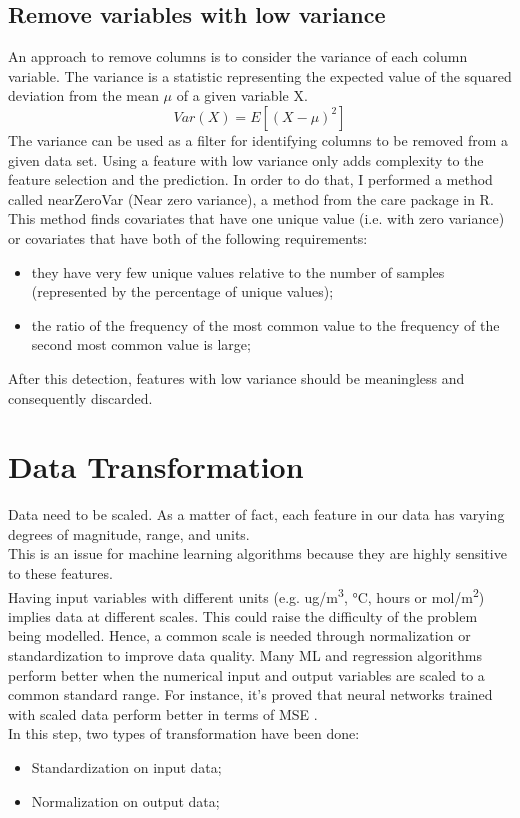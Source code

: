 \subsection{Remove variables with low variance}
An approach to remove columns is to consider the variance of each column variable. The variance is a statistic representing the expected value of the squared deviation from the mean $\mu$ of a given variable X. 
\begin{equation}
  Var(X) = E[(X-\mu)^2]
\end{equation}
The variance can be used as a filter for identifying columns to be removed from a given data set. 
Using a feature with low variance only adds complexity to the feature selection and the prediction.\newline
In order to do that, I performed a method called nearZeroVar (Near zero variance), a method from the \gls{care} package in R.\\
This method finds covariates that have one unique value (i.e. with zero variance) or covariates that have both of the following requirements:
\begin{itemize}
\item they have very few unique values relative to the number of samples (represented by the percentage of unique values);
\item the ratio of the frequency of the most common value to the frequency of the second most common value is large;
\end{itemize}
After this detection, features with low variance should be meaningless and consequently discarded. 
\section{Data Transformation}
Data need to be scaled. As a matter of fact, each feature in our data has varying degrees of magnitude, range, and units. \\This is an issue for machine learning algorithms because they are highly sensitive to these features.\\ 
Having input variables with different units (e.g. ug/m\textsuperscript{3}, °C, hours or mol/m\textsuperscript{2}) implies data at different scales. This could raise the difficulty of the problem being modelled. \newline
Hence, a common scale is needed through normalization or standardization to improve data quality.\newline
Many ML and regression algorithms perform better when the numerical input and output variables are scaled to a common standard range. \newline
For instance, it's proved that neural networks trained with scaled data perform better in terms of MSE  \cite{shanker1996effect}.\\
In this step, two types of transformation have been done:
\begin{itemize}
    \item Standardization on input data;
    \item Normalization on output data;
\end{itemize}
